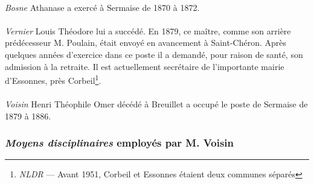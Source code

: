 \documentclass[../eBook.tex]{subfiles}
\begin{document}
      \paragraph{}\textit{Bosne} Athanase a exercé à Sermaise de 1870 à 1872.
      \paragraph{}\textit{Vernier} Louis Théodore lui a succédé. En 1879, ce maître, comme son arrière prédécesseur M. Poulain, était envoyé en avancement à Saint-Chéron. Après quelques années d'exercice dans ce poste il a demandé, pour raison de santé, son admission à la retraite. Il est actuellement secrétaire de l'importante mairie d'Essonnes, près Corbeil\footnote{\textit{NLDR} --- Avant 1951, Corbeil et Essonnes étaient deux communes séparés}.
      \paragraph{}\textit{Voisin} Henri Théophile Omer décédé à Breuillet a occupé le poste de Sermaise de 1879 à 1886.

      \subsubsection*{\og \textit{Moyens disciplinaires} \fg{} employés par M. Voisin}
\end{document}
